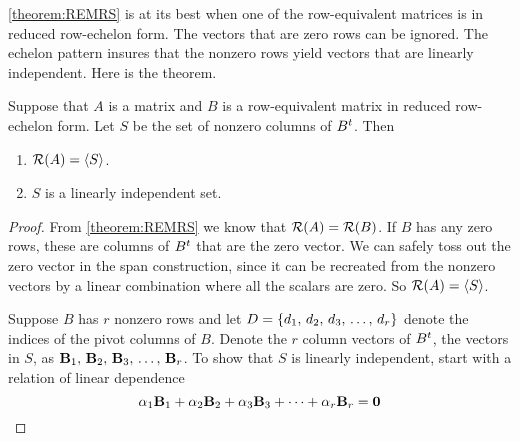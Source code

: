 \documentclass{ximera}
\begin{document}
\ref{theorem:REMRS} is at its best when one of the row-equivalent
matrices is in reduced row-echelon form.  The vectors that are zero
rows can be ignored.  The echelon pattern insures that the nonzero
rows yield vectors that are linearly independent.  Here is the
theorem.

\begin{theorem}
  \label{theorem:BRS}

  Suppose that $A$ is a matrix and $B$ is a row-equivalent matrix in
  reduced row-echelon form.  Let $S$ be the set of nonzero columns of
  $B^{t}$.  Then
  \begin{enumerate}
  \item $\mathcal{R}\!\left(A\right)=\left\langle S\right\rangle$.
  \item $S$ is a linearly independent set.
  \end{enumerate}

  \begin{proof}
    From \ref{theorem:REMRS} we know that $\mathcal{R}\!\left(A\right)=\mathcal{R}\!\left(B\right)$.  If $B$
    has any zero rows, these are columns of $B^{t}$ that are
    the zero vector.  We can safely toss out the zero vector in the
    span construction, since it can be recreated from the nonzero
    vectors by a linear combination where all the scalars are zero.
    So $\mathcal{R}\!\left(A\right)=\left\langle S\right\rangle$.

    Suppose $B$ has $r$ nonzero rows and let
    $D=\left\{d_1,\,d_2,\,d_3,\,\ldots,\,d_r\right\}$ denote the indices of the
    pivot columns of $B$.  Denote the $r$ column vectors of
    $B^{t}$, the vectors in $S$, as $\mathbf{B}_{1},\,\mathbf{B}_{2},\,\mathbf{B}_{3},\,\ldots,\,\mathbf{B}_{r}$.  To
    show that $S$ is linearly independent, start with a relation of
    linear dependence
    \[
      \alpha_{1}\mathbf{B}_{1}+\alpha_{2}\mathbf{B}_{2}+\alpha_{3}\mathbf{B}_{3}+\cdots +\alpha_{r}\mathbf{B}_{r}=\mathbf{0}
    \]


\end{proof}
\end{theorem}
\end{document}
